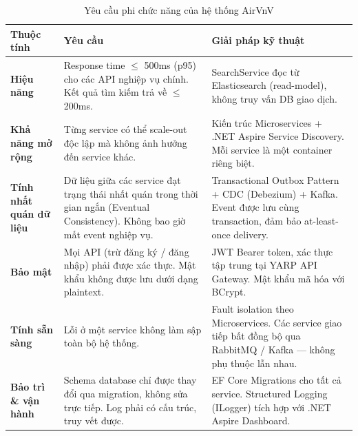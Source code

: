 \begin{table}[H]
  \centering
  \caption{Yêu cầu phi chức năng của hệ thống AirVnV}
  \label{tab:nfr}
  \renewcommand{\arraystretch}{1.4}
  \begin{tabularx}{\textwidth}{|l|X|X|}
    \hline
    \textbf{Thuộc tính}                               & \textbf{Yêu cầu} & \textbf{Giải pháp kỹ thuật} \\
    \hline
    \textbf{Hiệu năng}                                &
    Response time $\leq$ 500ms (p95) cho các API nghiệp vụ chính.
    Kết quả tìm kiếm trả về $\leq$ 200ms.             &
    SearchService đọc từ Elasticsearch (read-model),
    không truy vấn DB giao dịch.                                                                       \\
    \hline
    \textbf{Khả năng mở rộng}                         &
    Từng service có thể scale-out độc lập mà không
    ảnh hưởng đến service khác.                       &
    Kiến trúc Microservices + .NET Aspire Service Discovery.
    Mỗi service là một container riêng biệt.                                                           \\
    \hline
    \textbf{Tính nhất quán dữ liệu}                   &
    Dữ liệu giữa các service đạt trạng thái nhất quán
    trong thời gian ngắn (Eventual Consistency).
    Không bao giờ mất event nghiệp vụ.                &
    Transactional Outbox Pattern + CDC (Debezium) + Kafka.
    Event được lưu cùng transaction, đảm bảo at-least-once delivery.                                   \\
    \hline
    \textbf{Bảo mật}                                  &
    Mọi API (trừ đăng ký / đăng nhập) phải được xác thực.
    Mật khẩu không được lưu dưới dạng plaintext.      &
    JWT Bearer token, xác thực tập trung tại YARP API Gateway.
    Mật khẩu mã hóa với BCrypt.                                                                        \\
    \hline
    \textbf{Tính sẵn sàng}                            &
    Lỗi ở một service không làm sập toàn bộ hệ thống. &
    Fault isolation theo Microservices.
    Các service giao tiếp bất đồng bộ qua RabbitMQ / Kafka — không phụ thuộc lẫn nhau.                 \\
    \hline
    \textbf{Bảo trì \& vận hành}                      &
    Schema database chỉ được thay đổi qua migration,
    không sửa trực tiếp.
    Log phải có cấu trúc, truy vết được.              &
    EF Core Migrations cho tất cả service.
    Structured Logging (ILogger) tích hợp với .NET Aspire Dashboard.                                   \\
    \hline
  \end{tabularx}
\end{table}


